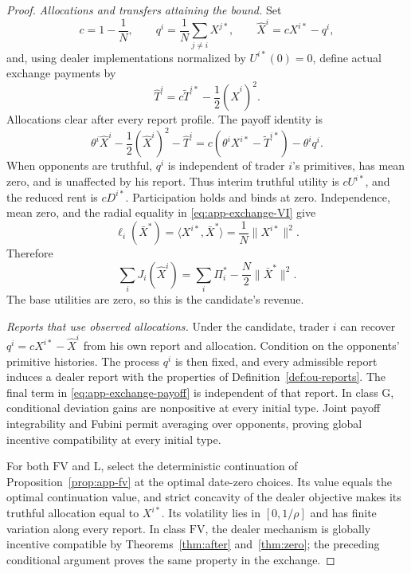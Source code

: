 \documentclass[12pt]{article}
\begin{document}
\begin{proof}
\emph{Allocations and transfers attaining the bound.}
Set
\[
  c=1-\frac1N,\qquad
  q^i=\frac1N\sum_{j\ne i}X^{j\ast},\qquad
  \widehat X^i=cX^{i\ast}-q^i,
\]
and, using dealer implementations normalized by \(U^{i\ast}(0)=0\),
define actual exchange payments by
\begin{equation}\label{eq:app-exchange-transfer}
  \widehat T^i
  =c\widetilde T^{i\ast}-\frac12(\widehat X^i)^2 .
\end{equation}
Allocations clear after every report profile. The payoff identity is
\begin{equation}\label{eq:app-exchange-payoff}
  \theta^i\widehat X^i-\frac12(\widehat X^i)^2-\widehat T^i
  =c(\theta^iX^{i\ast}-\widetilde T^{i\ast})-\theta^iq^i .
\end{equation}
When opponents are truthful, \(q^i\) is independent of trader \(i\)'s
primitives, has mean zero, and is unaffected by his report. Thus interim
truthful utility is \(cU^{i\ast}\), and the reduced rent is
\(cD^{i\ast}\). Participation holds and binds at zero.
Independence, mean zero, and the radial equality in
\eqref{eq:app-exchange-VI} give
\[
  \ell_i(\bar X^\ast)
    =\langle X^{i\ast},\bar X^\ast\rangle
    =\frac1N\|X^{i\ast}\|^2.
\]
Therefore
\[
  \sum_iJ_i(\widehat X^i)
    =\sum_i\Pi_i^\ast-\frac N2\|\bar X^\ast\|^2.
\]
The base utilities are zero, so this is the candidate's revenue.

\emph{Reports that use observed allocations.}
Under the candidate, trader \(i\) can recover
\(q^i=cX^{i\ast}-\widehat X^i\) from his own report and allocation.
Condition on the opponents' primitive histories. The process \(q^i\)
is then fixed, and every admissible report induces a dealer report
with the properties of Definition~\ref{def:ou-reports}.
The final term in \eqref{eq:app-exchange-payoff} is independent of
that report. In class \(\mathrm G\), conditional deviation gains
are nonpositive at every initial type. Joint payoff integrability
and Fubini permit averaging over opponents, proving global incentive
compatibility at every initial type.

For both \(\mathrm{FV}\) and \(\mathrm L\), select the deterministic
continuation of Proposition~\ref{prop:app-fv} at the optimal date-zero
choices. Its value equals the optimal continuation value, and strict
concavity of the dealer objective makes its truthful allocation equal
to \(X^{i\ast}\). Its volatility lies in \([0,1/\rho]\) and has finite
variation along every report. In class \(\mathrm{FV}\), the dealer
mechanism is globally incentive compatible by
Theorems~\ref{thm:after} and~\ref{thm:zero}; the preceding conditional
argument proves the same property in the exchange.


\end{proof}
\end{document}
